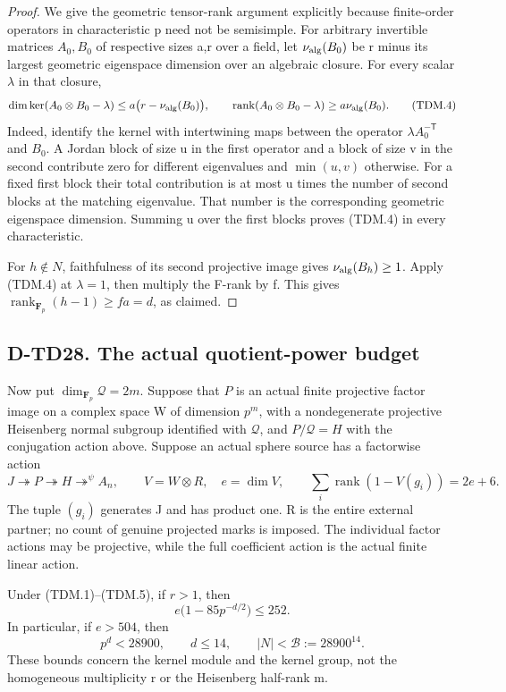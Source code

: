 \begin{proof}
We give the geometric tensor-rank argument explicitly because
finite-order operators in characteristic p need not be semisimple.
For arbitrary invertible matrices \(A_0,B_0\) of respective sizes
a,r over a field, let \(\nu_{\rm alg}(B_0)\) be r minus its
largest geometric eigenspace dimension over an algebraic closure.
For every scalar \(\lambda\) in that closure,
\[
 \dim\ker(A_0\otimes B_0-\lambda)
       \le a\bigl(r-\nu_{\rm alg}(B_0)\bigr),\qquad
 \operatorname{rank}(A_0\otimes B_0-\lambda)
       \ge a\nu_{\rm alg}(B_0).
 \tag{TDM.4}
\]
Indeed, identify the kernel with intertwining maps between the
operator \(\lambda A_0^{-\mathsf T}\) and \(B_0\).
A Jordan block of size u in the first operator and a block of
size v in the second contribute zero for different eigenvalues
and \(\min(u,v)\) otherwise.  For a fixed first block their total
contribution is at most u times the number of second blocks at
the matching eigenvalue.  That number is the corresponding
geometric eigenspace dimension.  Summing u over the first blocks
proves (TDM.4) in every characteristic.

For \(h\notin N\), faithfulness of its second projective image
gives \(\nu_{\rm alg}(B_h)\ge1\).  Apply (TDM.4) at
\(\lambda=1\), then multiply the F-rank by f.  This gives
\(\operatorname{rank}_{\mathbf F_p}(h-1)\ge fa=d\), as claimed.
\end{proof}

\subsection*{D-TD28. The actual quotient-power budget}

Now put \(\dim_{\mathbf F_p}\mathcal Q=2m\).  Suppose that
\(P\) is an actual finite projective factor image on a complex
space W of dimension \(p^m\), with a nondegenerate projective
Heisenberg normal subgroup identified with \(\mathcal Q\), and
\(P/\mathcal Q=H\) with the conjugation action above.
Suppose an actual sphere source has a factorwise action
\[
 J\twoheadrightarrow P\twoheadrightarrow H
       \mathop{\twoheadrightarrow}^{\psi} A_n,
 \qquad V=W\otimes R,\quad e=\dim V,
 \qquad
 \sum_i\operatorname{rank}(1-V(g_i))=2e+6.
 \tag{TDM.5}
\]
The tuple \((g_i)\) generates J and has product one.  R is the
entire external partner; no count of genuine projected marks is
imposed.  The individual factor actions may be projective, while
the full coefficient action is the actual finite linear action.

\begin{theorem}[D-TD28]
Under (TDM.1)--(TDM.5), if \(r>1\), then
\[
             e\bigl(1-85p^{-d/2}\bigr)\le252.
 \tag{TDM.6}
\]
In particular, if \(e>504\), then
\[
 p^d<28900,
 \qquad d\le14,
 \qquad |N|<\mathcal B:=28900^{14}.
 \tag{TDM.7}
\]
These bounds concern the kernel module and the kernel group, not
the homogeneous multiplicity r or the Heisenberg half-rank m.
\end{theorem}

